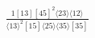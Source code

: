 \documentclass[varwidth, border=5pt]{standalone}
\begin{document}
\begin{my}
$\begin{gathered}
\scriptscriptstyle\frac{1[13][45]^2⟨23⟩⟨12⟩}{⟨13⟩^2[15]⟨25⟩⟨35⟩[35]}
\end{gathered}$
\end{my}
\end{document}
